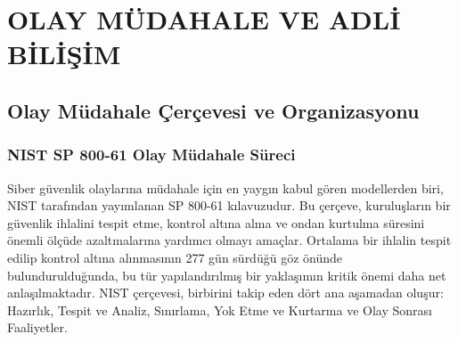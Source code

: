 
\chapter{OLAY MÜDAHALE VE ADLİ BİLİŞİM}


\section{Olay Müdahale Çerçevesi ve Organizasyonu}

\subsection{NIST SP 800-61 Olay Müdahale Süreci}

Siber güvenlik olaylarına müdahale için en yaygın kabul gören modellerden biri, NIST tarafından yayımlanan SP 800-61 kılavuzudur. Bu çerçeve, kuruluşların bir güvenlik ihlalini tespit etme, kontrol altına alma ve ondan kurtulma süresini önemli ölçüde azaltmalarına yardımcı olmayı amaçlar. Ortalama bir ihlalin tespit edilip kontrol altına alınmasının 277 gün sürdüğü göz önünde bulundurulduğunda, bu tür yapılandırılmış bir yaklaşımın kritik önemi daha net anlaşılmaktadır. NIST çerçevesi, birbirini takip eden dört ana aşamadan oluşur: Hazırlık, Tespit ve Analiz, Sınırlama, Yok Etme ve Kurtarma ve Olay Sonrası Faaliyetler.

